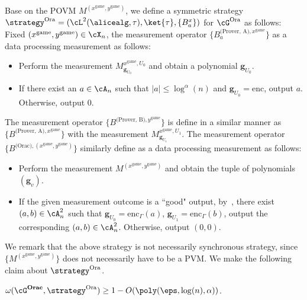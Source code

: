 Base on the POVM $M^{(x^{\text{game}}, y^{\text{game}})}$, we define a symmetric strategy $\strategy^{\text{Ora}} =(\cL^2(\alicealg, \tau), \ket{\tau}, \{B_a^x \})$ for $\cG^{\text{Ora}}$ as follows: Fixed $(x^{\text{game}}, y^{\text{game}}) \in \cX_n$, the measurement operator $\{B^{\text{(Prover, A)}, x^{\text{game}}}_a\}$ as a data processing measurement as follows:
\begin{itemize}
	\item Perform the measurement $M^{x^{\text{game}}, U_0}_{\textbf{g}_{U_0}}$ and obtain a polynomial $\textbf{g}_{U_0}$.
	\item If there exist an $a \in \cA_n$ such that $|a| \leq \log^{\alpha}(n)$ and $\textbf{g}_{U_0} = \text{enc}$, output $a$. Otherwise, output $0$. 
\end{itemize}
The measurement operator $\{B^{\text{(Prover, B)}, y^{\text{game}}}\}$ is define in a similar manner as $\{B^{\text{(Prover, A)}, x^{\text{game}}}\}$ with the measurement $M^{x^{\text{game}}, U_1}_{\textbf{g}_{U_1}}$. The measurement operator $\{B^{\text{(Orac)}, (x^{\text{game}},y^{\text{game}})}\}$ similarly define as a data processing measurement as follows:
\begin{itemize}
	\item Perform the measurement $M^{(x^{\text{game}}, y^{\text{game}})}$ and obtain the tuple of polynomials $(\textbf{g}_{v})$.
	\item If the given measurement outcome is a ``good" output, by~, there exist $(a,b) \in \cA_n^2$ such that $\textbf{g}_{U_0} = \text{enc}_{\Gamma}(a)$, $\textbf{g}_{U_1} = \text{enc}_{\Gamma}(b)$, output the corresponding $(a,b) \in \cA_n^2$. Otherwise, output $(0,0)$. 
\end{itemize}
We remark that the above strategy is not necessarily synchronous strategy, since $\{M^{(x^{\text{game}}, y^{\text{game}})}\}$ does not necessarily have to be a PVM. We make the following claim about $\strategy^{\text{Ora}}$. 
\begin{claim}
	$\omega(\cG^{\textbf{Orac}}, \strategy^{\text{Ora}}) \geq 1 - O(\poly(\eps, \log(n), \alpha))$. 
\end{claim}
